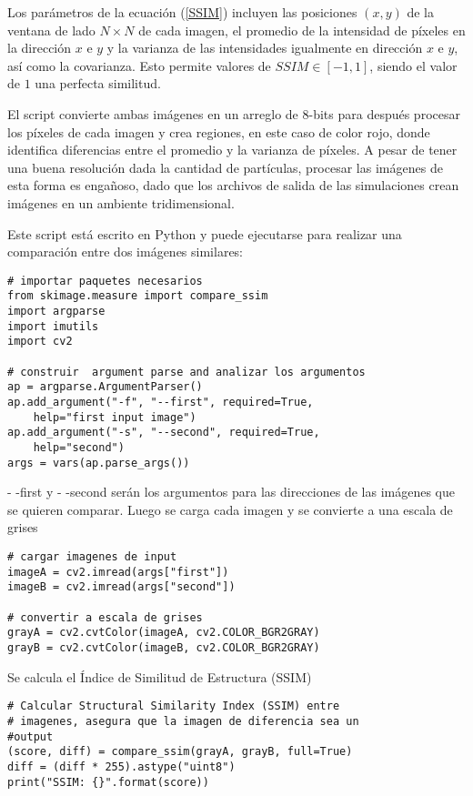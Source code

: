 \documentclass[a4paper,openright,12pt]{book}
\begin{document}
Los parámetros de la ecuación (\ref{SSIM}) incluyen las posiciones $(x,y)$ de la ventana de lado $N\times N$ de cada imagen, el promedio de la intensidad de píxeles en la dirección $x$ e $y$ y la varianza de las intensidades igualmente en dirección $x$ e $y$, así como la covarianza. Esto permite valores de $SSIM \in [-1,1]$, siendo el valor de $1$ una perfecta similitud. 

El script convierte ambas imágenes en un arreglo de $8$-bits para después procesar los píxeles de cada imagen y crea regiones, en este caso de color rojo, donde identifica diferencias entre el promedio y la varianza de píxeles. A pesar de tener una buena resoluci\'on dada la cantidad de partículas, procesar las imágenes de esta forma es engañoso, dado que los archivos de salida de las simulaciones crean imágenes en un ambiente tridimensional.

Este script está escrito en Python y puede ejecutarse para realizar una comparación entre dos imágenes similares:
\begin{verbatim}
# importar paquetes necesarios
from skimage.measure import compare_ssim
import argparse
import imutils
import cv2
 
# construir  argument parse and analizar los argumentos
ap = argparse.ArgumentParser()
ap.add_argument("-f", "--first", required=True,
	help="first input image")
ap.add_argument("-s", "--second", required=True,
	help="second")
args = vars(ap.parse_args())
\end{verbatim}

\textsf{- -first} y \textsf{- -second} serán los argumentos para las direcciones de las imágenes que se quieren comparar. Luego se carga cada imagen y se convierte a una escala de grises

\begin{verbatim}
# cargar imagenes de input
imageA = cv2.imread(args["first"])
imageB = cv2.imread(args["second"])
 
# convertir a escala de grises
grayA = cv2.cvtColor(imageA, cv2.COLOR_BGR2GRAY)
grayB = cv2.cvtColor(imageB, cv2.COLOR_BGR2GRAY)
\end{verbatim}

Se calcula el Índice de Similitud de Estructura (SSIM)
\begin{verbatim}
# Calcular Structural Similarity Index (SSIM) entre
# imagenes, asegura que la imagen de diferencia sea un 
#output
(score, diff) = compare_ssim(grayA, grayB, full=True)
diff = (diff * 255).astype("uint8")
print("SSIM: {}".format(score))
\end{verbatim}
\end{document}
